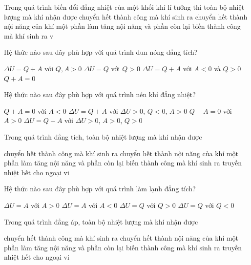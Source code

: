 \begin{ex}
	Trong quá trình biến đổi đẳng nhiệt của một khối khí lí tưởng thì toàn bộ nhiệt lượng mà khí nhận được
	\choice
	{\True chuyển hết thành công mà khí sinh ra}
	{chuyển hết thành nội năng của khí}
	{một phần làm tăng nội năng và phần còn lại biến thành công mà khí sinh ra}
	{v}
	\loigiai{}
\end{ex}
\begin{ex}
	Hệ thức nào sau đây phù hợp với quá trình đun nóng đẳng tích?
	
	\choice
	{$\Delta U=Q+A$ với $Q,A>0$}
	{\True $\Delta U=Q$ với $Q>0$}
	{$\Delta U=Q+A$ với $A<0$ và $Q>0$}
	{$Q+A=0$}
	\loigiai{}
\end{ex}
\begin{ex}
Hệ thức nào sau đây phù hợp với quá trình nén khí đẳng nhiệt?
	
	\choice
	{$Q+A=0$ với $A<0$}
	{$\Delta U=Q+A$ với $\Delta U>0$, $Q<0$, $A>0$}
	{\True $Q+A=0$ với $A>0$}
	{$\Delta U=Q+A$ với $\Delta U>0$, $A>0$, $Q>0$}
	\loigiai{}
\end{ex}
\begin{ex}
Trong quá trình đẳng tích, toàn bộ nhiệt lượng mà khí nhận được
	
	\choice
	{chuyển hết thành công mà khí sinh ra}
	{\True chuyển hết thành nội năng của khí}
	{một phần làm tăng nội năng và phần còn lại biến thành công mà khí sinh ra}
	{truyền nhiệt hết cho ngoại vi}
	\loigiai{}
\end{ex}
\begin{ex}
Hệ thức nào sau đây phù hợp với quá trình làm lạnh đẳng tích?
	
	\choice
	{$\Delta U=A$ với $A>0$}
	{$\Delta U=A$ với $A<0$}
	{$\Delta U=Q$ với $Q>0$}
	{\True $\Delta U=Q$ với $Q<0$}
	\loigiai{}
\end{ex}
\begin{ex}
	Trong quá trình đẳng áp, toàn bộ nhiệt lượng mà khí nhận được
	
	\choice
	{chuyển hết thành công mà khí sinh ra}
	{chuyển hết thành nội năng của khí}
	{\True một phần làm tăng nội năng và phần còn lại biến thành công mà khí sinh ra}
	{truyền nhiệt hết cho ngoại vi}
	\loigiai{}
\end{ex}
